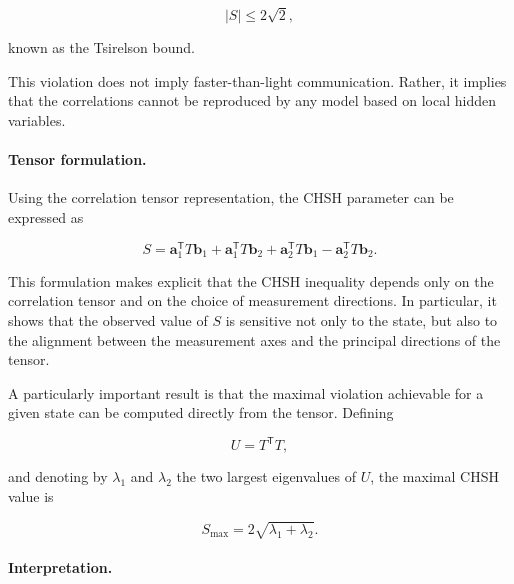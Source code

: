 \begin{equation}
|S| \le 2\sqrt{2},
\label{eq:tsirelson_bound}
\end{equation}

known as the Tsirelson bound.

This violation does not imply faster-than-light communication. Rather, it implies that the correlations cannot be reproduced by any model based on local hidden variables.

\medskip

\paragraph{Tensor formulation.}

Using the correlation tensor representation, the CHSH parameter can be expressed as

\begin{equation}
S
=
\mathbf{a}_1^{\mathsf T} T \mathbf{b}_1
+
\mathbf{a}_1^{\mathsf T} T \mathbf{b}_2
+
\mathbf{a}_2^{\mathsf T} T \mathbf{b}_1
-
\mathbf{a}_2^{\mathsf T} T \mathbf{b}_2.
\label{eq:chsh_tensor_form}
\end{equation}

This formulation makes explicit that the CHSH inequality depends only on the correlation tensor and on the choice of measurement directions. In particular, it shows that the observed value of \( S \) is sensitive not only to the state, but also to the alignment between the measurement axes and the principal directions of the tensor.

\medskip

A particularly important result is that the maximal violation achievable for a given state can be computed directly from the tensor. Defining

\begin{equation}
U = T^{\mathsf T}T,
\label{eq:horodecki_matrix}
\end{equation}

and denoting by \( \lambda_1 \) and \( \lambda_2 \) the two largest eigenvalues of \( U \), the maximal CHSH value is

\begin{equation}
S_{\max}
=
2\sqrt{\lambda_1+\lambda_2}.
\label{eq:chsh_smax_horodecki}
\end{equation}

\medskip

\paragraph{Interpretation.}

